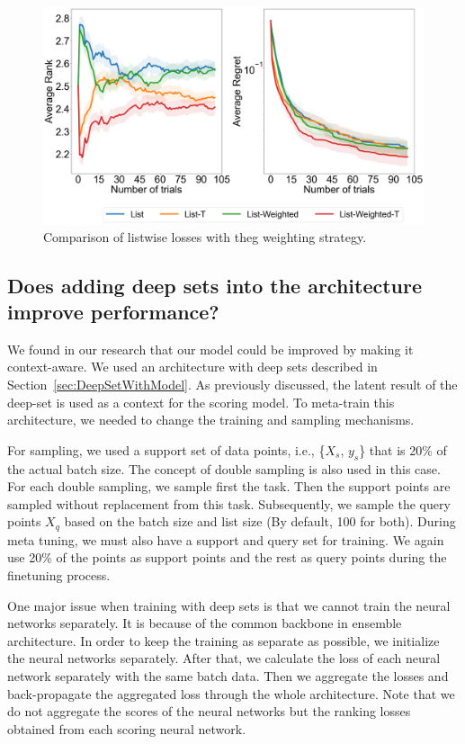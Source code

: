 \documentclass[12pt, twoside, ngerman]{report}
\begin{document}
\begin{figure}[h]
  \centering
    \includegraphics[scale=0.25]{images/Q2Ablation}
    \caption{Comparison of listwise losses with theg weighting strategy.}
    \label{fig:Q2Ablation}
\end{figure}


\subsection{Does adding deep sets into the architecture improve performance?}

We found in our research that our model could be improved by making it context-aware. We used an architecture with deep sets described in Section~\ref{sec:DeepSetWithModel}. As previously discussed, the latent result of the deep-set is used as a context for the scoring model. To meta-train this architecture,  we needed to change the training and sampling mechanisms.

For sampling, we used a support set of data points, i.e., \{$X_s$, $y_s$\} that is 20\% of the actual batch size. The concept of double sampling is also used in this case. For each double sampling, we sample first the task.
Then the support points are sampled without replacement from this task.
Subsequently, we sample the query points $X_q$ based on the batch size and list size (By default, 100 for both).
During meta tuning, we must also have a support and query set for training.
We again use 20\% of the points as support points and the rest as query points during the finetuning process.

One major issue when training with deep sets is that we cannot train the neural networks separately.
It is because of the common backbone in ensemble architecture.
In order to keep the training as separate as possible, we initialize the neural networks separately. After that, we calculate the loss of each neural network separately with the same batch data. Then we aggregate the losses and back-propagate the aggregated loss through the whole architecture. Note that we do not aggregate the scores of the neural networks but the ranking losses obtained from each scoring neural network.
\end{document}
